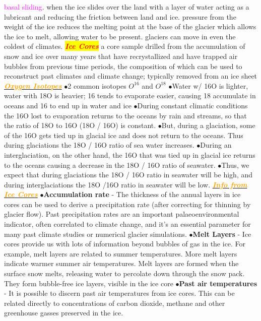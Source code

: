 \documentclass{article}
\newcommand{\ddd}{$\bullet$}
\newcommand{\red}[1]{\textcolor{red}{#1}}
\newcommand{\pink}[1]{\textcolor{magenta}{#1}}
\newcommand{\orange}[1]{\textcolor{orange}{#1}}
\newcommand{\mysection}[1]{\colorbox{yellow}{\textbf{\textit{\red{#1}}}}}
\newcommand{\mysub}[1]{\underline{\textbf{{\textit{\orange{#1}}}}}}
\newcommand{\vocab}[1]{{\pink{#1}}}
\begin{document}
\begin{multicols*}{4}
		\vocab{basal sliding}. when the ice slides over the land with a layer of water acting as a lubricant and reducing the friction between land and ice. pressure from the weight of the ice reduces the melting point at the base of the glacier which allows the ice to melt, allowing water to be present.  glaciers can move in even the coldest of climates.
        \mysection{Ice Cores} a core sample drilled from the accumulation of snow and ice over many years that have recrystallized and have trapped air bubbles from previous time periods, the composition of which can be used to reconstruct past climates and climate change; typically removed from an ice sheet
        \mysub{Oxygen Isotopes}
            \ddd 2 common isotopes $O^16$ and $O^18$
            \ddd Water w/ 16O is lighter, water with 18O is heavier; 16 tends to evaporate easier, causing 18 accumulate in oceans and 16 to end up in water and ice
            \ddd During constant climatic conditions the 16O lost to evaporation returns to the oceans by rain and streams, so that the ratio of 18O to 16O (18O / 16O) is constant.
            \ddd But, during a glaciation, some of the 16O gets tied up in glacial ice and does not return to the oceans. Thus during glaciations the 18O / 16O ratio of sea water increases.
            \ddd During an interglaciation, on the other hand, the 16O that was tied up in glacial ice returns to the oceans causing a decrease in the 18O / 16O ratio of seawater.
            \ddd Thus, we expect that during glaciations the 18O / 16O ratio in seawater will be high, and during interglaciations the 18O /16O ratio in seawater will be low.
        \mysub{Info from Ice Cores}
            \ddd \textbf{Accumulation rate} - The thickness of the annual layers in ice cores can be used to derive a precipitation rate (after correcting for thinning by glacier flow). Past precipitation rates are an important palaeoenvironmental indicator, often correlated to climate change, and it’s an essential parameter for many past climate studies or numerical glacier simulations.
            \ddd \textbf{Melt Layers} - Ice cores provide us with lots of information beyond bubbles of gas in the ice. For example, melt layers are related to summer temperatures. More melt layers indicate warmer summer air temperatures. Melt layers are formed when the surface snow melts, releasing water to percolate down through the snow pack. They form bubble-free ice layers, visible in the ice core
            \ddd \textbf{Past air temperatures} - It is possible to discern past air temperatures from ice cores. This can be related directly to concentrations of carbon dioxide, methane and other greenhouse gasses preserved in the ice.

\end{multicols*}
\end{document}

